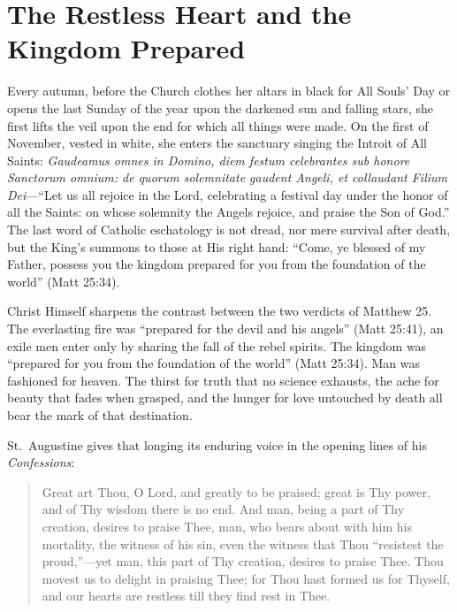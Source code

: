 \section{The Restless Heart and the Kingdom Prepared}

Every autumn, before the Church clothes her altars in black for All Souls' Day or opens the last Sunday of the year upon the darkened sun and falling stars, she first lifts the veil upon the end for which all things were made. On the first of November, vested in white, she enters the sanctuary singing the Introit of All Saints: \textit{Gaudeamus omnes in Domino, diem festum celebrantes sub honore Sanctorum omnium: de quorum solemnitate gaudent Angeli, et collaudant Filium Dei}---``Let us all rejoice in the Lord, celebrating a festival day under the honor of all the Saints: on whose solemnity the Angels rejoice, and praise the Son of God.'' The last word of Catholic eschatology is not dread, nor mere survival after death, but the King's summons to those at His right hand: ``Come, ye blessed of my Father, possess you the kingdom prepared for you from the foundation of the world'' (Matt 25:34).

Christ Himself sharpens the contrast between the two verdicts of Matthew 25. The everlasting fire was ``prepared for the devil and his angels'' (Matt 25:41), an exile men enter only by sharing the fall of the rebel spirits. The kingdom was ``prepared for you from the foundation of the world'' (Matt 25:34). Man was fashioned for heaven. The thirst for truth that no science exhausts, the ache for beauty that fades when grasped, and the hunger for love untouched by death all bear the mark of that destination.

St.\ Augustine gives that longing its enduring voice in the opening lines of his \textit{Confessions}:

\begin{quote}
Great art Thou, O Lord, and greatly to be praised; great is Thy power, and of Thy wisdom there is no end. And man, being a part of Thy creation, desires to praise Thee, man, who bears about with him his mortality, the witness of his sin, even the witness that Thou ``resistest the proud,''---yet man, this part of Thy creation, desires to praise Thee. Thou movest us to delight in praising Thee; for Thou hast formed us for Thyself, and our hearts are restless till they find rest in Thee.
\end{quote}

